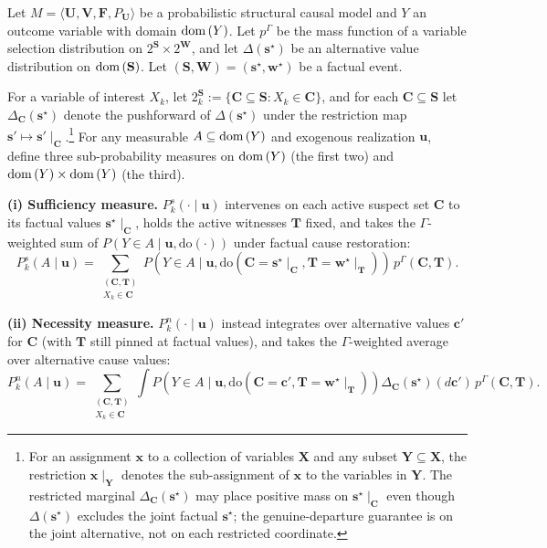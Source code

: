 \begin{definition} \label{def:jointnecsuf}
Let $M=\langle \mathbf{U},\mathbf{V},\mathbf{F},P_{\mathbf{U}}\rangle$
be a probabilistic structural causal model
and $Y$ an outcome variable with domain $\operatorname{dom}\,(Y)$.
Let $p^\Gamma$ be the mass function of a variable selection distribution on
$2^{\mathbf{S}} \times 2^{\mathbf{W}}$, and let
$\Delta(\mathbf{s}^\star)$ be an alternative value distribution on $\operatorname{dom}\,(\mathbf{S})$.
Let $(\mathbf{S},\mathbf{W})=(\mathbf{s}^\star,\mathbf{w}^\star)$ be a factual event.

For a variable of
interest $X_k$, let
$2^{\mathbf{S}}_{k}:=\{\mathbf{C}\subseteq\mathbf{S}:X_k\in\mathbf{C}\}$,
and for each $\mathbf{C}\subseteq\mathbf{S}$ let
$\Delta_{\mathbf{C}}(\mathbf{s}^\star)$ denote the pushforward of
$\Delta(\mathbf{s}^\star)$ under the restriction map
$\mathbf{s}'\mapsto \mathbf{s}'\!\mid_{\mathbf{C}}$.\footnote{For an assignment $\mathbf{x}$ to a collection of variables $\mathbf{X}$ and any subset $\mathbf{Y}\subseteq\mathbf{X}$, the restriction $\mathbf{x}\!\mid_{\mathbf{Y}}$ denotes the sub-assignment of $\mathbf{x}$ to the variables in $\mathbf{Y}$. The restricted marginal $\Delta_{\mathbf{C}}(\mathbf{s}^\star)$ may place positive mass on $\mathbf{s}^\star\!\mid_{\mathbf{C}}$ even though $\Delta(\mathbf{s}^\star)$ excludes the joint factual $\mathbf{s}^\star$; the genuine-departure guarantee is on the joint alternative, not on each restricted coordinate.}
For any measurable $A\subseteq\operatorname{dom}\,(Y)$ and exogenous realization $\mathbf{u}$, define three
sub-probability measures on $\operatorname{dom}\,(Y)$ (the first two) and $\operatorname{dom}\,(Y)\times\operatorname{dom}\,(Y)$ (the third).

\textbf{(i) Sufficiency measure.} $P_k^s(\cdot\mid\mathbf{u})$ intervenes on each
active suspect set $\mathbf{C}$ to its factual values $\mathbf{s}^\star\!\mid_{\mathbf{C}}$,
holds the active witnesses $\mathbf{T}$ fixed, and takes the $\Gamma$-weighted sum of
$P(Y\in A\mid\mathbf{u},\mathrm{do}(\cdot))$ under factual cause restoration:
\begin{equation}
P_k^{s}(A\mid\mathbf{u})
=
\sum_{\substack{(\mathbf{C},\mathbf{T})\\X_k\in\mathbf{C}}}
P\!\left(Y\in A \mid \mathbf{u},
\mathrm{do}\!\left(\mathbf{C}=\mathbf{s}^\star\!\mid_{\mathbf{C}},
\mathbf{T}=\mathbf{w}^\star\!\mid_{\mathbf{T}}\right)\right)
\,p^\Gamma(\mathbf{C},\mathbf{T}).
\end{equation}

\textbf{(ii) Necessity measure.} $P_k^n(\cdot\mid\mathbf{u})$ instead integrates
over alternative values $\mathbf{c}'$ for $\mathbf{C}$ (with $\mathbf{T}$ still pinned at
factual values), and takes the $\Gamma$-weighted average over alternative cause values:
\begin{equation}
P_k^{n}(A\mid\mathbf{u})
=
\sum_{\substack{(\mathbf{C},\mathbf{T})\\X_k\in\mathbf{C}}}
\int
P\!\left(Y\in A \mid \mathbf{u},
\mathrm{do}\!\left(\mathbf{C}=\mathbf{c}',\mathbf{T}=\mathbf{w}^\star\!\mid_{\mathbf{T}}\right)\right)
\Delta_{\mathbf{C}}(\mathbf{s}^\star)(d\mathbf{c}')
\,p^\Gamma(\mathbf{C},\mathbf{T}).
\end{equation}


\end{definition}
